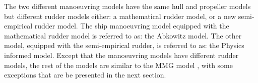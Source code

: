 The two different manoeuvring models have the same hull and propeller models but different rudder models either:
a mathematical rudder model, or a new semi-empirical rudder model.
The ship manoeuvring model equipped with the mathematical rudder model is referred to as: the Abkowitz model. The other model, equipped with the semi-empirical rudder, is referred to as: the Physics informed model. Except that the manoeuvring models have different rudder models, the rest of the models are similar to the MMG model \citep{yasukawa_introduction_2015}, with some exceptions that are be presented in the next section.